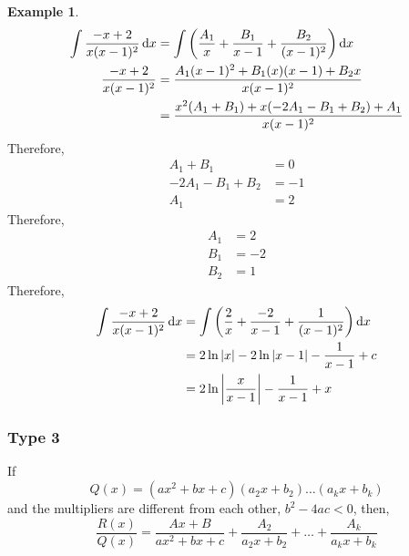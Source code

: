 \documentclass[fleqn]{article}
\theoremstyle{definition}
\newtheorem{example}{Example}
\theoremstyle{theorem}
\theoremstyle{remark}
\begin{document}
\begin{example}
	\begin{align*}
		\int \dfrac{-x + 2}{x(x - 1)^2} \dif x &= \int \left(\dfrac{A_1}{x} + \dfrac{B_1}{x - 1} + \dfrac{B_2}{(x - 1)^2}\right) \dif x\\
		\dfrac{-x + 2}{x(x - 1)^2} &= \dfrac{A_1 (x - 1)^2 + B_1 (x)(x - 1) + B_2 x}{x(x - 1)^2}\\
		&= \dfrac{x^2(A_1 + B_1) + x(-2A_1 - B_1 + B_2) + A_1}{x(x - 1)^2}
	\end{align*}
	Therefore,
	\begin{align*}
		A_1 + B_1 &= 0\\
		-2A_1 - B_1 + B_2 &= -1\\
		A_1 &= 2
	\end{align*}
	Therefore, 
	\begin{align*}
		A_1 &= 2\\
		B_1 &= -2\\
		B_2 &= 1
	\end{align*}
	Therefore,
	\begin{align*}
		\int \dfrac{-x + 2}{x(x - 1)^2} \dif x &= \int \left(\dfrac{2}{x} + \dfrac{-2}{x - 1} + \dfrac{1}{(x - 1)^2}\right) \dif x\\
		&= 2 \ln |x| - 2 \ln |x - 1| - \dfrac{1}{x - 1} + c\\
		&= 2 \ln \left|\dfrac{x}{x - 1}\right| - \dfrac{1}{x - 1} + x
	\end{align*}
\end{example}

\subsubsection{Type 3}

If 
\begin{equation*}
Q(x) = (ax^2 + bx + c) (a_2 x + b_2) \dots (a_k x + b_k)
\end{equation*}
and the multipliers are different from each other, $b^2 - 4ac < 0$, then,
\begin{equation*}
\dfrac{R(x)}{Q(x)} = \dfrac{Ax + B}{ax^2 + bx + c} + \dfrac{A_2}{a_2 x + b_2} + \dots + \dfrac{A_k}{a_k x + b_k}
\end{equation*}
\end{document}
